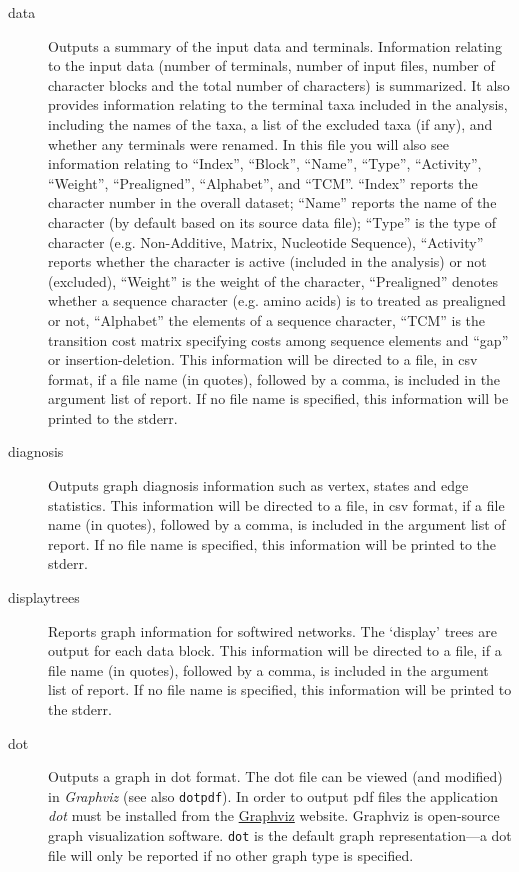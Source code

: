 \begin{description}
		\item[data] Outputs a summary of the input data and terminals. Information relating 
		to the input data (number of terminals, number of input files, number of character 
		blocks and the total number of characters) is summarized. It also provides
		information relating to the terminal taxa included in the analysis, including the 
		names of the taxa, a list of the excluded taxa (if any), and whether any terminals 
		were renamed. In this file you will also see information relating to ``Index'', ``Block'', 
		``Name'', ``Type'', ``Activity'', ``Weight'', ``Prealigned'', ``Alphabet'', and ``TCM''. 
		``Index'' reports the character number in the overall dataset; ``Name'' reports the 
		name of the character (by default based on its source data file); ``Type'' is the type 
		of character (e.g. Non-Additive, Matrix, Nucleotide Sequence), ``Activity'' reports 
		whether the character is active (included in the analysis) or not (excluded), 
		``Weight'' is the weight of the character, ``Prealigned''  denotes whether a 
		sequence character (e.g. amino acids) is to treated as prealigned or not, 
		``Alphabet'' the elements of a sequence character, ``TCM'' is the transition cost 
		matrix specifying costs among sequence elements and ``gap'' or insertion-deletion.
		This information will be directed to a file, in csv format, if a file name (in quotes), 
		followed by a comma, is included in the argument list of report. If no file name is 
		specified, this information will be printed to the stderr.
	
		\item[diagnosis] Outputs graph diagnosis information such as vertex, states 
		and edge statistics. This information will be directed to a file, in csv format, if a 
		file name (in quotes), followed by a comma, is included in the argument list of 
		report. If no file name is specified, this information will be printed to the stderr.
		
		\item[displaytrees] Reports graph information for softwired networks. The 
		`display' trees are output for each data block. This information will be directed 
		to a file, if a file name (in quotes), followed by a comma, is included in the 
		argument list of report. If no file name is specified, this information 
		will be printed to the stderr.
		
		\item[dot] Outputs a graph in dot format. The dot file can be viewed (and 
		modified) in \textit{Graphviz} (see also \texttt{dotpdf}). In order to output pdf 
		files the application \textit{dot} must be installed from the 
		\href{https://graphviz.org/download/}{Graphviz} 	website. Graphviz is 
		open-source graph visualization software. \texttt{dot} is the default graph 
		representation---a dot file will only be reported if no other graph type is specified. 
		

\end{description}
